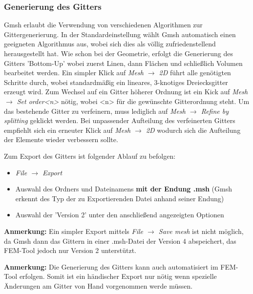  \subsubsection{Generierung des Gitters}
 Gmsh erlaubt die Verwendung von verschiedenen Algorithmen zur Gittergenerierung. In der Standardeinstellung wählt Gmsh automatisch einen geeigneten Algorithmus aus, wobei sich dies als völlig zufriedenstellend herausgestellt hat. Wie schon bei der Geometrie, erfolgt die Generierung des Gitters 'Bottom-Up' wobei zuerst Linen, dann Flächen und schließlich Volumen bearbeitet werden. Ein simpler Klick auf \textit{Mesh $\rightarrow$ 2D} führt alle genötigten Schritte durch, wobei standardmäßig ein lineares, 3-knotiges Dreiecksgitter erzeugt wird. Zum Wechsel auf ein Gitter höherer Ordnung ist ein Kick auf \textit{Mesh $\rightarrow$ Set order<n>} nötig, wobei <n> für die gewünschte Gitterordnung steht. Um das bestehende Gitter zu verfeinern, muss lediglich auf \textit{Mesh $\rightarrow$ Refine by splitting} geklickt werden. Bei unpassender Aufteilung des verfeinerten Gitters empfiehlt sich ein erneuter Klick auf \textit{Mesh $\rightarrow$ 2D} wodurch sich die Aufteilung der Elemente wieder verbessern sollte.\newline
 
 Zum Export des Gitters ist folgender Ablauf zu befolgen:
 \begin{itemize}
 	\item \textit{File $\rightarrow$ Export}
 	\item Auswahl des Ordners und Dateinamens \textbf{mit der Endung .msh} (Gmsh erkennt des Typ der zu Exportierenden Datei anhand seiner Endung)
 	\item Auswahl der 'Version 2' unter den anschließend angezeigten Optionen
 \end{itemize}

\textbf{Anmerkung:} Ein simpler Export mittels \textit{File $\rightarrow$ Save mesh} ist nicht möglich, da Gmsh dann das Gittern in einer .msh-Datei der Version 4 abspeichert, das FEM-Tool jedoch nur Version 2 unterstützt.\newline

\textbf{Anmerkung:} Die Generierung des Gitters kann auch automatisiert im FEM-Tool erfolgen. Somit ist ein händischer Export nur nötig wenn spezielle Änderungen am Gitter von Hand vorgenommen werde müssen.
